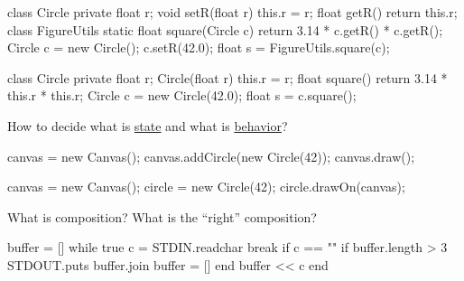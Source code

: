 \documentclass{article}
\begin{document}
\begin{pptWide}{2}
{\small\begin{ffcode}
class Circle {
  private float r;
  void setR(float r) { this.r = r; }
  float getR() { return this.r; }
}
class FigureUtils {
  static float square(Circle c) {
    return 3.14 * c.getR() * c.getR();
  }
}
Circle c = new Circle();
c.setR(42.0);
float s = FigureUtils.square(c);
\end{ffcode}
}
\par\columnbreak\par
{\small\begin{ffcode}
class Circle {
  private float r;
  Circle(float r) { this.r = r; }
  float square() {
    return 3.14 * this.r * this.r;
  }
}
Circle c = new Circle(42.0);
float s = c.square();
\end{ffcode}
}\par
How to decide what is \ul{state} and what is \ul{behavior}?
\end{pptWide}
\plush{}

\begin{pptWide}{2}
{\small\begin{ffcode}
canvas = new Canvas();
canvas.addCircle(new Circle(42));
canvas.draw();
\end{ffcode}
}
\par\columnbreak\par
{\small\begin{ffcode}
canvas = new Canvas();
circle = new Circle(42);
circle.drawOn(canvas);
\end{ffcode}
}\par
\end{pptWide}
What is composition? What is the ``right'' composition?
\plush{}


\begin{pptWide}{2}
{\small\begin{ffcode}
buffer = []
while true
  c = STDIN.readchar
  break if c == "\n"
  if buffer.length > 3
    STDOUT.puts buffer.join
    buffer = []
  end
  buffer << c
end
\end{ffcode}
}
\par\columnbreak\par
{\small{}
}
\end{pptWide}
\plush{}
\end{document}
